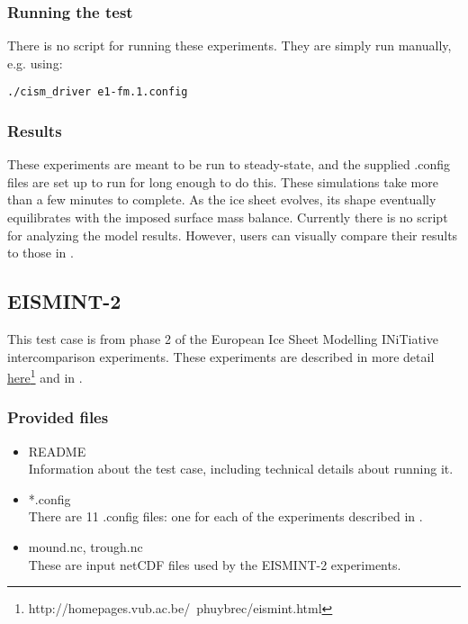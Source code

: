 \subsubsection{Running the test}
There is no script for running these experiments. They are simply run manually, e.g. using: 

\texttt{./cism\_driver e1-fm.1.config}

\subsubsection{Results}
\label{subsecc:eismint_results}
These experiments are meant to be run to steady-state, and the supplied .config files are set up to run for long enough to do this.
These simulations take more than a few minutes to complete.
As the ice sheet evolves, its shape eventually equilibrates with the imposed surface mass balance.  
Currently there is no script for analyzing the model results.  
However, users can visually compare their results to those in \citet{Huybrechts1996}.


\subsection{EISMINT-2}
\label{sec:eismint2_description}
This test case is from phase 2 of the European Ice Sheet Modelling INiTiative intercomparison experiments.  These experiments are described in more detail
\href{http://homepages.vub.ac.be/~phuybrec/eismint.html}{here}\footnote{http://homepages.vub.ac.be/~phuybrec/eismint.html} and in \citet{Payne2000}.

\subsubsection{Provided files}
\label{subsec:eismint2_files}

\begin{itemize}
	\item README \\
	Information about the test case, including technical details about running it.
  	\item *.config \\
  	There are 11 .config files: one for each of the experiments described in \citet{Payne2000}.
  	\item mound.nc, trough.nc \\
    	These are input netCDF files used by the EISMINT-2 experiments.
\end{itemize}

